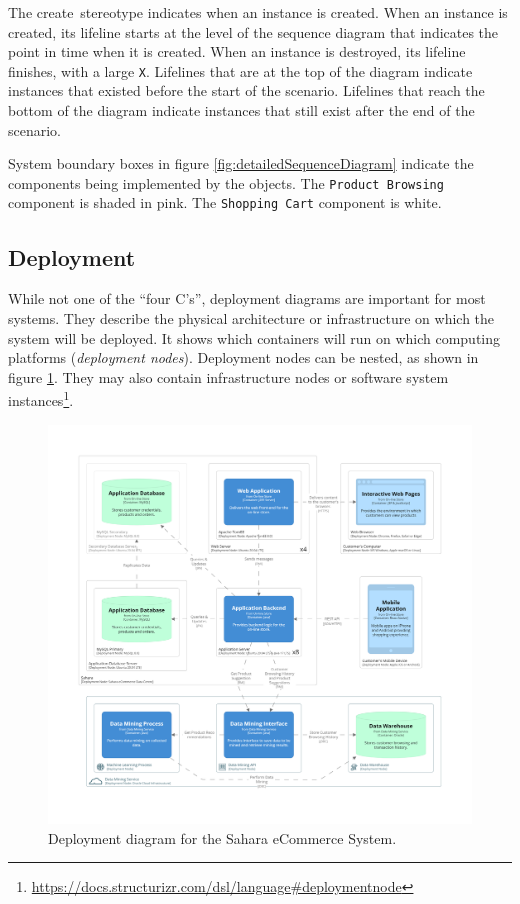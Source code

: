The \guillemotleft create\guillemotright~stereotype indicates when an instance is created.
When an instance is created, its lifeline starts at the level of the sequence diagram that indicates the point in time when it is created.
When an instance is destroyed, its lifeline finishes, with a large \texttt{X}.
Lifelines that are at the top of the diagram indicate instances that existed before the start of the scenario.
Lifelines that reach the bottom of the diagram indicate instances that still exist after the end of the scenario.

System boundary boxes in figure \ref{fig:detailedSequenceDiagram} indicate the components being implemented by the objects.
The \texttt{Product Browsing} component is shaded in pink.
The \texttt{Shopping Cart} component is white.

\subsection{Deployment}\label{sec:c4_deployment}
While not one of the ``four C's'', deployment diagrams are important for most systems.
They describe the physical architecture or infrastructure on which the system will be deployed.
It shows which containers will run on which computing platforms (\emph{deployment nodes}).
Deployment nodes can be nested, as shown in figure \ref{fig:c4_deployment}.
They may also contain infrastructure nodes or software system instances\footnote{\url{https://docs.structurizr.com/dsl/language\#deploymentnode}}.

\begin{figure}[h!]
    \centering
    \begin{adjustwidth}{-7.5mm}{-7.5mm}
        \includegraphics[trim=195 235 195 198,clip,width=0.95\paperwidth]{images/c4/deployment_diagram.png}
    \end{adjustwidth}
    \caption{Deployment diagram for the Sahara eCommerce System.}
    \label{fig:c4_deployment}
\end{figure}

